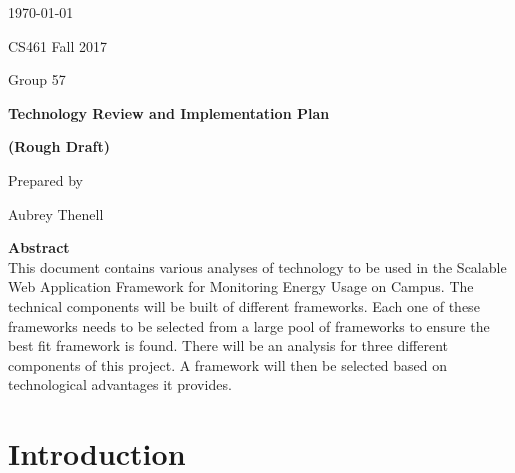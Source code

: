 \documentclass[onecolumn, draftclsnofoot,10pt, compsoc]{IEEEtran}
\newcommand{\NameSigPair}[1]{\par
\makebox[2.75in][r]{#1} \hfil 	\makebox[3.25in]{\makebox[2.25in]{\hrulefill} \hfill		\makebox[.75in]{\hrulefill}}
\par\vspace{-12pt} \textit{\tiny\noindent
\makebox[2.75in]{} \hfil		\makebox[3.25in]{\makebox[2.25in][r]{Signature} \hfill	\makebox[.75in][r]{Date}}}}
\renewcommand{\NameSigPair}[1]{#1}
\begin{document}
\begin{titlepage}
    \begin{singlespace}
        \hfill 
        \par\vspace{.2in}
        \centering
        \scshape{
            {\large\today}\par
			{\large CS461 Fall 2017}\par
			{\large Group 57}\par
            \vspace{2.5in}
            \textbf{\Huge{Technology Review and Implementation Plan}}\par
			\textbf{\Huge{(Rough Draft)}}\par
            \vspace{2.5in}
            {\large Prepared by }\par
            \vspace{5pt}
            {\Large
                \NameSigPair{Aubrey Thenell}\par
			\vfill
			\textbf{Abstract} \\
            \indent 
				This document contains various analyses of technology to be used in the Scalable Web Application Framework for Monitoring Energy Usage on Campus. The technical components will be built of different frameworks. Each one of these frameworks needs to be selected from a large pool of frameworks to ensure the best fit framework is found. There will be an analysis for three different components of this project. A framework will then be selected based on technological advantages it provides.
            }
            \vspace{20pt}
        }
      
    \end{singlespace}
\end{titlepage}
\newpage
{}


\section{Introduction}
	
\end{document}
